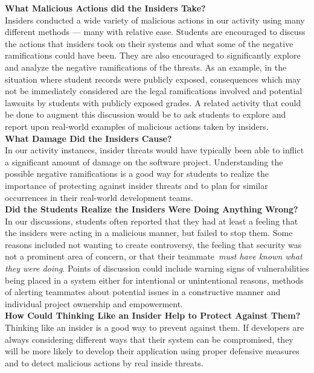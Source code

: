 \documentclass[conference]{IEEEtran}
\begin{document}
\textbf{What Malicious Actions did the Insiders Take?}\\
Insiders conducted a wide variety of malicious actions in our activity using many different methods --- many with relative ease. Students are encouraged to discuss the actions that insiders took on their systems and what some of the negative ramifications could have been. They are also encouraged to significantly explore and analyze the negative ramifications of the threats. As an example, in the situation where student records were publicly exposed, consequences which may not be immediately considered are the legal ramifications involved and potential lawsuits by students with publicly exposed grades. A related activity that could be done to augment this discussion would be to ask students to explore and report upon real-world examples of malicious actions taken by insiders. \\


\textbf{What Damage Did the Insiders Cause?}\\
In our activity instances, insider threats would have typically been able to inflict a significant amount of damage on the software project. Understanding the possible negative ramifications is a good way for students to realize the importance of protecting against insider threats and to plan for similar occurrences in their real-world development teams. \\


\textbf{Did the Students Realize the Insiders Were Doing Anything Wrong?}\\
In our discussions, students often reported that they had at least a feeling that the insiders were acting in a malicious manner, but failed to stop them. Some reasons included not wanting to create controversy, the feeling that security was not a prominent area of concern, or that their teammate~\emph{must have known what they were doing}. Points of discussion could include warning signs of vulnerabilities being placed in a system either for intentional or unintentional reasons, methods of alerting teammates about potential issues in a constructive manner and individual project ownership and empowerment. \\

\textbf{How Could Thinking Like an Insider Help to Protect Against Them?}\\
Thinking like an insider is a good way to prevent against them. If developers are always considering different ways that their system can be compromised, they will be more likely to develop their application using proper defensive measures and to detect malicious actions by real inside threats. \\
\end{document}
